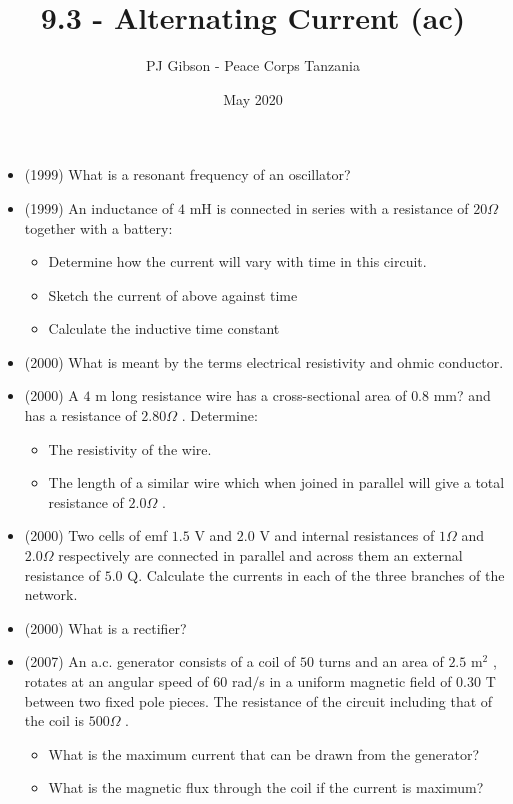 \documentclass{article}
\title{\textbf{9.3 - Alternating Current (ac)}}
\author{PJ Gibson - Peace Corps Tanzania}
\date{May 2020}
\begin{document}
\maketitle

\begin{itemize}
\item (1999)  What is a resonant frequency of an oscillator?
\item (1999)  An inductance of $ 4$ mH is connected in series with a resistance of $ 20\Omega $ together with a battery:
 \begin{itemize}
\item Determine how the current will vary with time in this circuit.
\item Sketch the current of above against time
\item Calculate the inductive time constant
\end{itemize}
\item (2000)  What is meant by the terms electrical resistivity and ohmic conductor.
\item (2000)  A $ 4$ m long resistance wire has a cross-sectional area of $ 0.8$ mm? and has a resistance of $ 2.80\Omega $ .  Determine:
 \begin{itemize}
\item The resistivity of the wire.
\item The length of a similar wire which when joined in parallel will give a total resistance of $ 2.0\Omega $ .
\end{itemize}
\item (2000)  Two cells of emf $ 1.5$ V and $ 2.0$ V and internal resistances of $ 1\Omega $ and $ 2.0\Omega $ respectively are connected in parallel and across them an external resistance of $ 5.0$ Q. Calculate the currents in each of the three branches of the network. 
\item (2000)  What is a rectifier?
\item (2007)  An a.c. generator consists of a coil of $ 50$ turns and an area of $ 2.5$ m$ ^{2}$ , rotates at an angular speed of $ 60$ rad$/$s in a uniform magnetic field of $ 0.30$ T between two fixed pole pieces.  The resistance of the circuit including that of the coil is $ 500\Omega $ .  
 \begin{itemize}
\item  What is the maximum current that can be drawn from the generator?
\item  What is the magnetic flux through the coil if the current is maximum?
\end{itemize}

\end{itemize}
\end{document}
